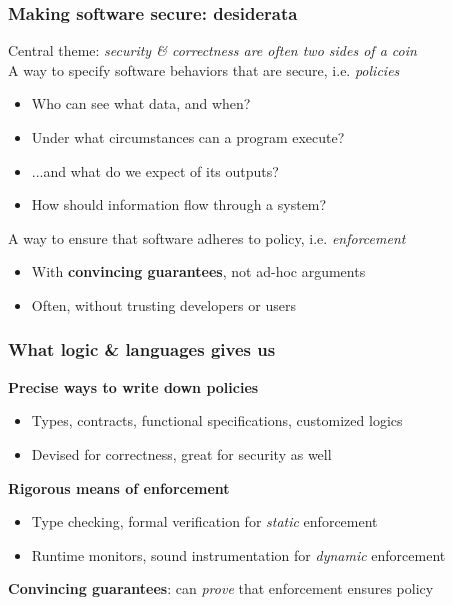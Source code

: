 \documentclass[10pt,handout]{beamer}
\begin{document}
\begin{frame}

\frametitle{Making software secure: desiderata}

Central theme: \emph{security \& correctness are often two sides of a coin}
\\[1em]

\pause
A way to specify software behaviors that are secure, i.e. \emph{policies} \pause
\begin{itemize}
  \item Who can see what data, and when?
  \item Under what circumstances can a program execute?
  \item ...and what do we expect of its outputs?
  \item How should information flow through a system? \\[1em]
\end{itemize}

\pause
A way to ensure that software adheres to policy, i.e. \emph{enforcement} \pause
\begin{itemize}
  \item With \textbf{convincing guarantees}, not ad-hoc arguments
  \item Often, without trusting developers or users
\end{itemize}

\end{frame}


\begin{frame}

\frametitle{What logic \& languages gives us}

\textbf{Precise ways to write down policies} \pause
\begin{itemize}
  \item Types, contracts, functional specifications, customized logics
  \item Devised for correctness, great for security as well \\[1em]
\end{itemize}

\pause
\textbf{Rigorous means of enforcement}
\begin{itemize}
  \item Type checking, formal verification for \emph{static} enforcement
  \item Runtime monitors, sound instrumentation for \emph{dynamic} enforcement \\[1em]
\end{itemize}

\pause
\textbf{Convincing guarantees}: can \emph{prove} that enforcement ensures policy

\end{frame}
\end{document}
